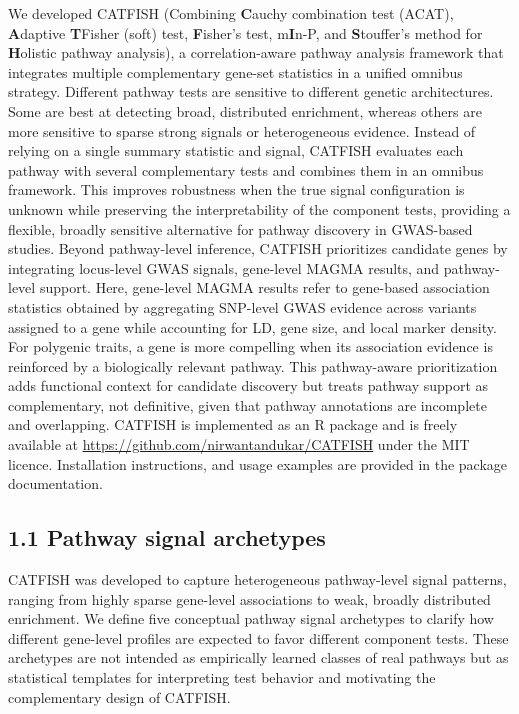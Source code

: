\documentclass[unnumsec,webpdf,contemporary,large]{oup-authoring-template}%
\theoremstyle{thmstyleone}%
\theoremstyle{thmstyletwo}%
\theoremstyle{thmstylethree}%
\begin{document}
We developed CATFISH (Combining \textbf{C}auchy combination test (ACAT), \textbf{A}daptive \textbf{T}Fisher (soft) test, \textbf{F}isher's test, m\textbf{I}n-P, and \textbf{S}touffer's method for \textbf{H}olistic pathway analysis), a correlation-aware pathway analysis framework that integrates multiple complementary gene-set statistics in a unified omnibus strategy. Different pathway tests are sensitive to different genetic architectures. Some are best at detecting broad, distributed enrichment, whereas others are more sensitive to sparse strong signals or heterogeneous evidence. Instead of relying on a single summary statistic and signal, CATFISH evaluates each pathway with several complementary tests and combines them in an omnibus framework. This improves robustness when the true signal configuration is unknown while preserving the interpretability of the component tests, providing a flexible, broadly sensitive alternative for pathway discovery in GWAS-based studies. Beyond pathway-level inference, CATFISH prioritizes candidate genes by integrating locus-level GWAS signals, gene-level MAGMA results, and pathway-level support. Here, gene-level MAGMA results refer to gene-based association statistics obtained by aggregating SNP-level GWAS evidence across variants assigned to a gene while accounting for LD, gene size, and local marker density. For polygenic traits, a gene is more compelling when its association evidence is reinforced by a biologically relevant pathway. This pathway-aware prioritization adds functional context for candidate discovery but treats pathway support as complementary, not definitive, given that pathway annotations are incomplete and overlapping. CATFISH is implemented as an R package and is freely available at
\url{https://github.com/nirwantandukar/CATFISH} under the MIT licence. Installation instructions, and usage examples are provided in the package documentation.

\subsection*{1.1 Pathway signal archetypes}

CATFISH was developed to capture heterogeneous pathway-level signal patterns, ranging from highly sparse gene-level associations to weak, broadly distributed enrichment. We define five conceptual pathway signal archetypes to clarify how different gene-level profiles are expected to favor different component tests. These archetypes are not intended as empirically learned classes of real pathways but as statistical templates for interpreting test behavior and motivating the complementary design of CATFISH.
\end{document}
